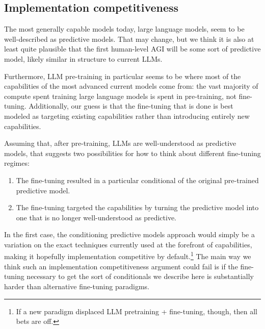 \documentclass[
  twocolumn,
  natbib,
]{miri-tech-article}
\begin{document}
\subsection{Implementation competitiveness}

The most generally capable models today, large language models, seem to be well-described as predictive models. That may change, but we think it is also at least quite plausible that the first human-level AGI will be some sort of predictive model, likely similar in structure to current LLMs.

Furthermore, LLM pre-training in particular seems to be where most of the capabilities of the most advanced current models come from: the vast majority of compute spent training large language models is spent in pre-training, not fine-tuning. Additionally, our guess is that the fine-tuning that is done is best modeled as targeting existing capabilities rather than introducing entirely new capabilities.

Assuming that, after pre-training, LLMs are well-understood as predictive models, that suggests two possibilities for how to think about different fine-tuning regimes:



\begin{enumerate}
\item The fine-tuning resulted in a particular conditional of the original pre-trained predictive model.
\item The fine-tuning targeted the capabilities by turning the predictive model into one that is no longer well-understood as predictive.
\end{enumerate}

In the first case, the conditioning predictive models approach would simply be a variation on the exact techniques currently used at the forefront of capabilities, making it hopefully implementation competitive by default.\footnote{If a new paradigm displaced LLM pretraining + fine-tuning, though, then all bets are off.} The main way we think such an implementation competitiveness argument could fail is if the fine-tuning necessary to get the sort of conditionals we describe here is substantially harder than alternative fine-tuning paradigms.
\end{document}
